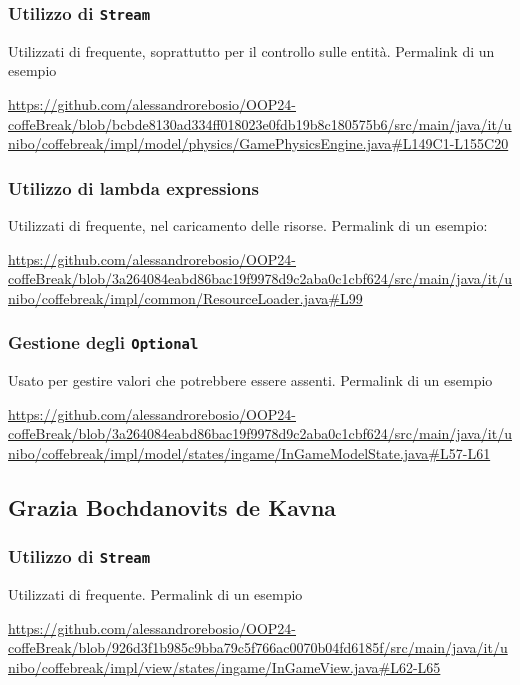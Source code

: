 \documentclass[a4paper,12pt]{report}
\begin{document}
\subsubsection{Utilizzo di \texttt{Stream}}
Utilizzati di frequente, soprattutto per il controllo sulle entità. Permalink di un esempio
\begin{sloppypar}
	\raggedright
	\url{https://github.com/alessandrorebosio/OOP24-coffeBreak/blob/bcbde8130ad334ff018023e0fdb19b8c180575b6/src/main/java/it/unibo/coffebreak/impl/model/physics/GamePhysicsEngine.java#L149C1-L155C20}
\end{sloppypar}

\subsubsection{Utilizzo di lambda expressions}
Utilizzati di frequente, nel caricamento delle risorse. Permalink di un esempio:
\begin{sloppypar}
	\raggedright
	\url{https://github.com/alessandrorebosio/OOP24-coffeBreak/blob/3a264084eabd86bac19f9978d9c2aba0c1cbf624/src/main/java/it/unibo/coffebreak/impl/common/ResourceLoader.java#L99}
\end{sloppypar}

\subsubsection{Gestione degli \texttt{Optional}}
Usato per gestire valori che potrebbere essere assenti. Permalink di un esempio
\begin{sloppypar}
	\raggedright
	\url{https://github.com/alessandrorebosio/OOP24-coffeBreak/blob/3a264084eabd86bac19f9978d9c2aba0c1cbf624/src/main/java/it/unibo/coffebreak/impl/model/states/ingame/InGameModelState.java#L57-L61}
\end{sloppypar}

\newpage
\subsection{Grazia Bochdanovits de Kavna}
\subsubsection{Utilizzo di \texttt{Stream}}
Utilizzati di frequente. Permalink di un esempio
\begin{sloppypar}
	\raggedright
	\url{https://github.com/alessandrorebosio/OOP24-coffeBreak/blob/926d3f1b985c9bba79c5f766ac0070b04fd6185f/src/main/java/it/unibo/coffebreak/impl/view/states/ingame/InGameView.java#L62-L65}
\end{sloppypar}
\end{document}
